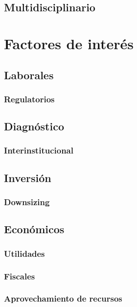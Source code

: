 \documentclass[draft,12pt,headsepline,footsepline,paper=letter]{scrreprt}
\begin{document}
\subsection{Multidisciplinario}

\section{Factores de interés}

\subsection{Laborales}

\subsubsection{Regulatorios}

\subsection{Diagnóstico}

\subsubsection{Interinstitucional}

\subsection{Inversión}

\subsubsection{Downsizing}

\subsection{Económicos}

\subsubsection{Utilidades}

\subsubsection{Fiscales}

\subsubsection{Aprovechamiento de recursos}
\end{document}
